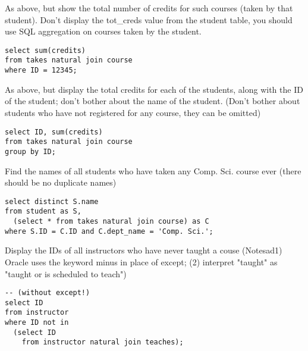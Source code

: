 \documentclass[logo,reportComp]{thesis}
\begin{document}
\begin{question}
\normalfont 
As above, but show the total number of credits for such courses (taken by that student). Don't display the tot\_creds value from the student table, you should use SQL aggregation on courses taken by the student.
\end{question}
\begin{answer}\mbox{}\par
\begin{lstlisting}
select sum(credits)
from takes natural join course
where ID = 12345;
\end{lstlisting}
\end{answer}

\begin{question}
\normalfont 
As above, but display the total credits for each of the students, along with the ID of the student; don't bother about the name of the student. (Don't bother about students who have not registered for any course, they can be omitted)
\end{question}
\begin{answer}\mbox{}\par
\begin{lstlisting}
select ID, sum(credits)
from takes natural join course
group by ID;
\end{lstlisting}
\end{answer}

\begin{question}
\normalfont 
Find the names of all students who have taken any Comp. Sci. course ever (there should be no duplicate names)
\end{question}
\begin{answer}\mbox{}\par
\begin{lstlisting}
select distinct S.name
from student as S, 
  (select * from takes natural join course) as C
where S.ID = C.ID and C.dept_name = 'Comp. Sci.';
\end{lstlisting}
\end{answer}

\begin{question}
\normalfont 
Display the IDs of all instructors who have never taught a couse (Notesad1) Oracle uses the keyword minus in place of except; (2) interpret "taught" as "taught or is scheduled to teach")
\end{question}
\begin{answer}\mbox{}\par
\begin{lstlisting}
-- (without except!)
select ID
from instructor
where ID not in
  (select ID
    from instructor natural join teaches);
\end{lstlisting}
\end{answer}
\end{document}

